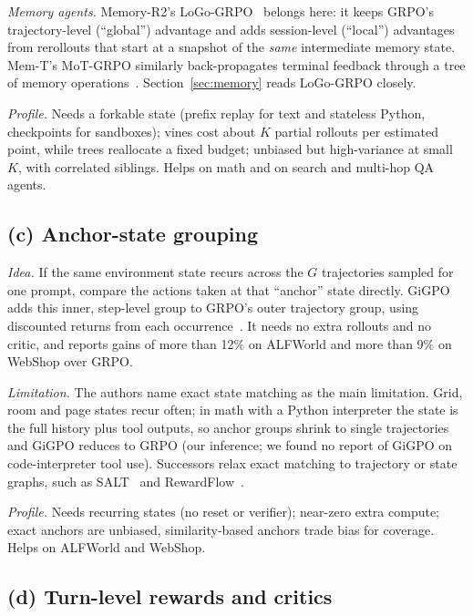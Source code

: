 \emph{Memory agents.} Memory-R2's LoGo-GRPO~\citep{yan2026memory} belongs here: it keeps GRPO's trajectory-level (``global'') advantage and adds session-level (``local'') advantages from rerollouts that start at a snapshot of the \emph{same} intermediate memory state. Mem-T's MoT-GRPO similarly back-propagates terminal feedback through a tree of memory operations~\citep{memt2026mem}. Section~\ref{sec:memory} reads LoGo-GRPO closely.

\emph{Profile.} Needs a forkable state (prefix replay for text and stateless Python, checkpoints for sandboxes); vines cost about $K$ partial rollouts per estimated point, while trees reallocate a fixed budget; unbiased but high-variance at small $K$, with correlated siblings. Helps on math and on search and multi-hop QA agents.

\subsection{(c) Anchor-state grouping}\label{sec:tax-gigpo}

\emph{Idea.} If the same environment state recurs across the $G$ trajectories sampled for one prompt, compare the actions taken at that ``anchor'' state directly. GiGPO adds this inner, step-level group to GRPO's outer trajectory group, using discounted returns from each occurrence~\citep{feng2025group}. It needs no extra rollouts and no critic, and reports gains of more than 12\% on ALFWorld and more than 9\% on WebShop over GRPO.

\emph{Limitation.} The authors name exact state matching as the main limitation. Grid, room and page states recur often; in math with a Python interpreter the state is the full history plus tool outputs, so anchor groups shrink to single trajectories and GiGPO reduces to GRPO (our inference; we found no report of GiGPO on code-interpreter tool use). Successors relax exact matching to trajectory or state graphs, such as SALT~\citep{salt2026step}\unverified{} and RewardFlow~\citep{rewardflow2026topology}\unverified.

\emph{Profile.} Needs recurring states (no reset or verifier); near-zero extra compute; exact anchors are unbiased, similarity-based anchors trade bias for coverage. Helps on ALFWorld and WebShop.

\subsection{(d) Turn-level rewards and critics}\label{sec:tax-turn}

